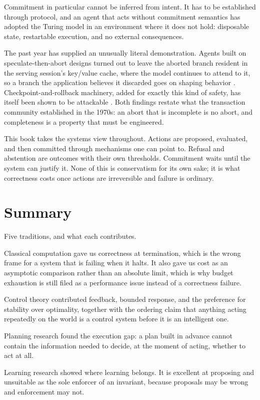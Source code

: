 \documentclass[11pt]{book}
\begin{document}
Commitment in particular cannot be inferred from intent. It has to be established through protocol, and an agent that acts without commitment semantics has adopted the Turing model in an environment where it does not hold: disposable state, restartable execution, and no external consequences.

The past year has supplied an unusually literal demonstration. Agents built on speculate-then-abort designs turned out to leave the aborted branch resident in the serving session's key/value cache, where the model continues to attend to it, so a branch the application believes it discarded goes on shaping behavior \cite{abortedkv2026}. Checkpoint-and-rollback machinery, added for exactly this kind of safety, has itself been shown to be attackable \cite{saferesume2026}. Both findings restate what the transaction community established in the 1970s: an abort that is incomplete is no abort, and completeness is a property that must be engineered.

This book takes the systems view throughout. Actions are proposed, evaluated, and then committed through mechanisms one can point to. Refusal and abstention are outcomes with their own thresholds. Commitment waits until the system can justify it. None of this is conservatism for its own sake; it is what correctness costs once actions are irreversible and failure is ordinary.

\section{Summary}

Five traditions, and what each contributes.

Classical computation gave us correctness at termination, which is the wrong frame for a system that is failing when it halts. It also gave us cost as an asymptotic comparison rather than an absolute limit, which is why budget exhaustion is still filed as a performance issue instead of a correctness failure.

Control theory contributed feedback, bounded response, and the preference for stability over optimality, together with the ordering claim that anything acting repeatedly on the world is a control system before it is an intelligent one.

Planning research found the execution gap: a plan built in advance cannot contain the information needed to decide, at the moment of acting, whether to act at all.

Learning research showed where learning belongs. It is excellent at proposing and unsuitable as the sole enforcer of an invariant, because proposals may be wrong and enforcement may not.
\end{document}
